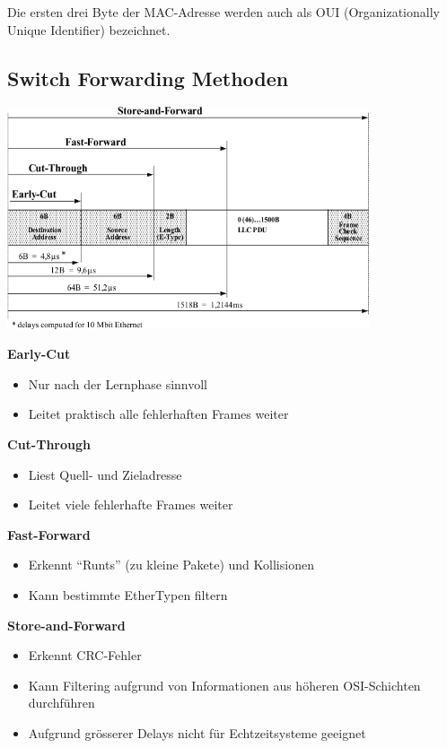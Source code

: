 Die ersten drei Byte der MAC-Adresse werden auch als OUI (Organizationally
Unique Identifier) bezeichnet.


\subsection{Switch Forwarding Methoden}

\begin{center}
	\includegraphics[width=0.8\textwidth]{media/switch_forwarding.png}
\end{center}

\begin{minipage}[t]{.45\linewidth}
	\textbf{Early-Cut}
	\begin{itemize}
		\item Nur nach der Lernphase sinnvoll
		\item Leitet praktisch alle fehlerhaften Frames weiter
	\end{itemize}
\end{minipage}
\hspace{.1\linewidth}
\begin{minipage}[t]{.45\linewidth}
	\textbf{Cut-Through}
	\begin{itemize}
		\item Liest Quell- und Zieladresse
		\item Leitet viele fehlerhafte Frames weiter
	\end{itemize}
\end{minipage}

\begin{minipage}[t]{.45\linewidth}
	\textbf{Fast-Forward}
	\begin{itemize}
		\item Erkennt ``Runts'' (zu kleine Pakete) und Kollisionen
		\item Kann bestimmte EtherTypen filtern
	\end{itemize}
\end{minipage}
\hspace{.1\linewidth}
\begin{minipage}[t]{.45\linewidth}
	\textbf{Store-and-Forward}
	\begin{itemize}
		\item Erkennt CRC-Fehler
		\item Kann Filtering aufgrund von Informationen aus höheren OSI-Schichten
			durchführen
		\item Aufgrund grösserer Delays nicht für Echtzeitsysteme geeignet
	\end{itemize}
\end{minipage}
